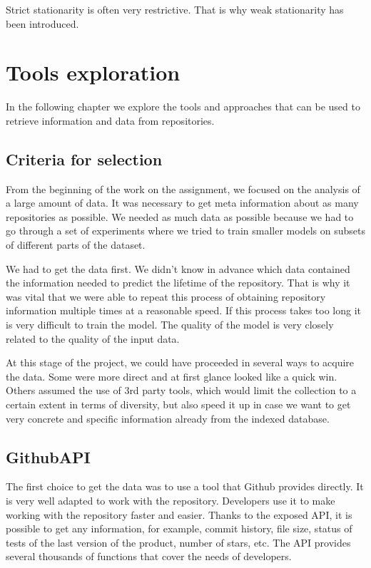 \documentclass[thesis=M,english]{FITthesis}[2019/12/23]
\begin{document}
Strict stationarity is often very restrictive. That is why weak stationarity has been introduced.

\chapter{Tools exploration}
\label{label:Useful_tools}
In the following chapter we explore the tools and approaches that can be used to retrieve information and data from repositories.

\section{Criteria for selection}
From the beginning of the work on the assignment, we focused on the analysis of a large amount of data. It was necessary to get meta information about as many repositories as possible. We needed as much data as possible because we had to go through a set of experiments where we tried to train smaller models on subsets of different parts of the dataset. 

We had to get the data first. We didn't know in advance which data contained the information needed to predict the lifetime of the repository. That is why it was vital that we were able to repeat this process of obtaining repository information multiple times at a reasonable speed. If this process takes too long it is very difficult to train the model. The quality of the model is very closely related to the quality of the input data.

At this stage of the project, we could have proceeded in several ways to acquire the data. Some were more direct and at first glance looked like a quick win. Others assumed the use of 3rd party tools, which would limit the collection to a certain extent in terms of diversity, but also speed it up in case we want to get very concrete and specific information already from the indexed database. 

\section{GithubAPI}
The first choice to get the data was to use a tool that Github provides directly. It is very well adapted to work with the repository. Developers use it to make working with the repository faster and easier.  Thanks to the exposed API, it is possible to get any information, for example, commit history, file size, status of tests of the last version of the product, number of stars, etc. The API provides several thousands of functions that cover the needs of developers.
\end{document}
